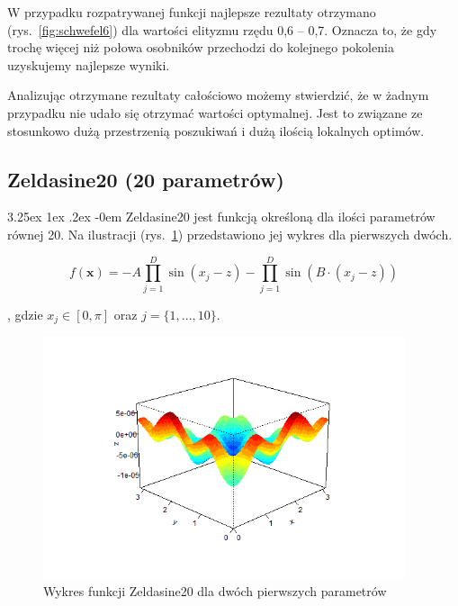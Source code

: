 \documentclass[11pt, a4paper]{article}
\makeatletter
\newcommand{\fbi}{\leavevmode{\parindent=1em\indent}}
\renewcommand\paragraph{\@startsection{paragraph}{5}{\z@}
  {3.25ex \@plus1ex \@minus.2ex}
  {-0em}
  {\normalfont\normalsize\bfseries}}
\makeatother
\begin{document}
\fbi
W przypadku rozpatrywanej funkcji najlepsze rezultaty otrzymano (rys.~\ref{fig:schwefel6}) dla wartości elityzmu rzędu 0,6 -- 0,7. Oznacza to, że gdy trochę więcej niż połowa osobników przechodzi do kolejnego pokolenia uzyskujemy najlepsze wyniki.

\fbi
Analizując otrzymane rezultaty całościowo możemy stwierdzić, że w żadnym przypadku nie udało się otrzymać wartości optymalnej. Jest to związane ze stosunkowo dużą przestrzenią poszukiwań i dużą ilością lokalnych optimów.

\newpage
\subsection{Zeldasine20 (20 parametrów)}
\paragraph{}
Zeldasine20 jest funkcją określoną dla ilości parametrów równej 20. Na ilustracji (rys.~\ref{fig:zeldasine1}) przedstawiono jej wykres dla pierwszych dwóch.

\begin{equation}\label{eq:zeldasine}
f(\boldsymbol{x}) = -A \prod_{j=1}^{D} \sin (x_j - z) - \prod_{j=1}^{D} \sin (B \cdot (x_j - z))
\end{equation}

, gdzie $ x_j \in [0, \pi]$ oraz $j = \{1, ..., 10\}$.

\begin{figure}[H]
	\begin{center}
		\includegraphics[width=0.95\textwidth]{./assets/Zeldasine201.png}
		\caption{Wykres funkcji Zeldasine20 dla dwóch pierwszych parametrów}
		\label{fig:zeldasine1}
	\end{center}
\end{figure}
\end{document}
